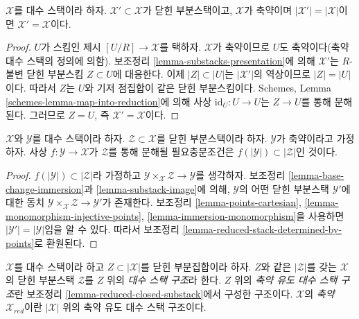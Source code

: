 \begin{lemma}
\label{lemma-reduced-stack-determined-by-points}
$\mathcal{X}$를 대수 스택이라 하자.
$\mathcal{X}' \subset \mathcal{X}$가 닫힌 부분스택이고,
$\mathcal{X}$가 축약이며 $|\mathcal{X}'| = |\mathcal{X}|$이면
$\mathcal{X}' = \mathcal{X}$이다.
\end{lemma}

\begin{proof}
$U$가 스킴인 제시 $[U/R] \to \mathcal{X}$를 택하자.
$\mathcal{X}$가 축약이므로 $U$도 축약이다(축약 대수 스택의 정의에 의함).
보조정리 \ref{lemma-substacks-presentation}에 의해 $\mathcal{X}'$는
$R$-불변 닫힌 부분스킴 $Z \subset U$에 대응한다.
이제 $|Z| \subset |U|$는 $|\mathcal{X}'|$의 역상이므로
$|Z| = |U|$이다. 따라서 $Z$는 $U$와 기저 점집합이 같은 닫힌 부분스킴이다.
Schemes, Lemma \ref{schemes-lemma-map-into-reduction}에 의해
사상 $\text{id}_U : U \to U$는 $Z \to U$를 통해 분해된다. 그러므로
$Z = U$, 즉 $\mathcal{X}' = \mathcal{X}$이다.
\end{proof}

\begin{lemma}
\label{lemma-map-into-reduction}
$\mathcal{X}$와 $\mathcal{Y}$를 대수 스택이라 하자.
$\mathcal{Z} \subset \mathcal{X}$를 닫힌 부분스택이라 하자.
$\mathcal{Y}$가 축약이라고 가정하자. 사상
$f : \mathcal{Y} \to \mathcal{X}$가 $\mathcal{Z}$를 통해 분해될
필요충분조건은 $f(|\mathcal{Y}|) \subset |\mathcal{Z}|$인 것이다.
\end{lemma}

\begin{proof}
$f(|\mathcal{Y}|) \subset |\mathcal{Z}|$라 가정하고
$\mathcal{Y} \times_\mathcal{X} \mathcal{Z} \to \mathcal{Y}$를 생각하자.
보조정리 \ref{lemma-base-change-immersion}과
\ref{lemma-substack-image}에 의해, $\mathcal{Y}$의 어떤 닫힌 부분스택
$\mathcal{Y}'$에 대한 동치
$\mathcal{Y} \times_\mathcal{X} \mathcal{Z} \to \mathcal{Y}'$가 존재한다.
보조정리 \ref{lemma-points-cartesian},
\ref{lemma-monomorphism-injective-points},
\ref{lemma-immersion-monomorphism}을 사용하면
$|\mathcal{Y}'| = |\mathcal{Y}|$임을 알 수 있다.
따라서 보조정리 \ref{lemma-reduced-stack-determined-by-points}로 환원된다.
\end{proof}

\begin{definition}
\label{definition-reduced-induced-stack}
$\mathcal{X}$를 대수 스택이라 하고 $Z \subset |\mathcal{X}|$를
닫힌 부분집합이라 하자. $Z$와 같은 $|\mathcal{Z}|$를 갖는
$\mathcal{X}$의 닫힌 부분스택 $\mathcal{Z}$를
{$Z$ 위의 \it 대수 스택 구조}라 한다.
$Z$ 위의 {\it 축약 유도 대수 스택 구조}란
보조정리 \ref{lemma-reduced-closed-substack}에서 구성한 구조이다.
{$\mathcal{X}$의 \it 축약 $\mathcal{X}_{red}$}이란
$|\mathcal{X}|$ 위의 축약 유도 대수 스택 구조이다.
\end{definition}

